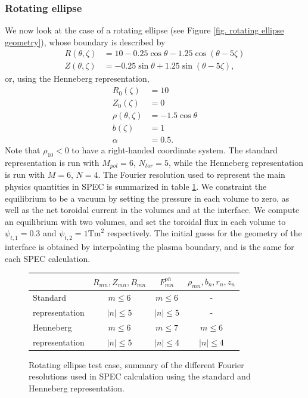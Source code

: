 \documentclass[my_thesis.tex]{subfiles}
\begin{document}
\subsubsection{Rotating ellipse}
We now look at the case of a rotating ellipse (see Figure \ref{fig. rotating ellipse geometry}), whose boundary is described by
\begin{align}
	R(\theta,\zeta) &= 10 - 0.25\cos\theta - 1.25\cos(\theta-5\zeta)\\
	Z(\theta,\zeta) &= -0.25\sin\theta + 1.25\sin(\theta-5\zeta),
\end{align}
or, using the Henneberg representation, 
\begin{align}
	R_0(\zeta) &= 10\\
	Z_0(\zeta) &= 0\\
	\rho(\theta,\zeta) &= -1.5\cos\theta\\
	b(\zeta) &= 1\\
	\alpha &= 0.5.
\end{align}
Note that $\rho_{10}<0$ to have a right-handed coordinate system. The standard representation is run with $M_{pol}=6$, $N_{tor}=5$, while the Henneberg representation is run with $M=6$, $N=4$. The Fourier resolution used to represent the main physics quantities in SPEC is summarized in table \ref{tab. ellipse res}. We constraint the equilibrium to be a vacuum by setting the pressure in each volume to zero, as well as the net toroidal current in the volumes and at the interface. We compute an equilibrium with two volumes, and set the toroidal flux in each volume to $\psi_{t,1}=0.3$ and $\psi_{t,2}=1\text{Tm}^2$ respectively. The initial guess for the geometry of the interface is obtained by interpolating the plasma boundary, and is the same for each SPEC calculation.


\begin{figure}
	\centering
	\begin{tabular}{l|c|c|c|}
		    & $R_{mn},Z_{mn},B_{mn}$ & $F^{ph}_{mn}$ & $\rho_{mn},b_n,r_n,z_n$ \\
		\hline
		Standard &  $m\leq 6$ & $m\leq 6$ & - \\
		representation	& $|n|\leq 5$ & $|n|\leq 5$ & - \\
		\hline
		Henneberg & $m\leq 6$ & $m\leq 7$ & $m\leq 6$\\
		representation & $|n|\leq 5$ & $|n|\leq 4$ & $|n|\leq 4$
	\end{tabular}
	\caption{Rotating ellipse test case, summary of the different Fourier resolutions used in SPEC calculation using the standard and Henneberg representation.}
	\label{tab. ellipse res}
\end{figure}
\end{document}
